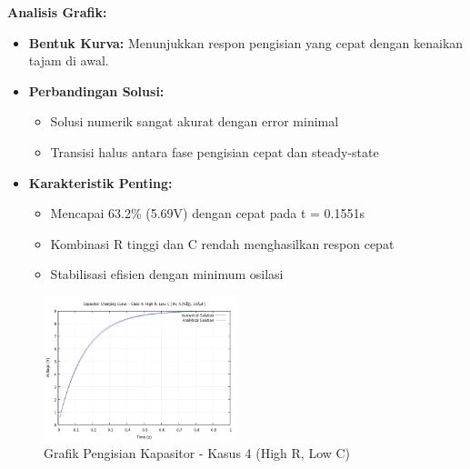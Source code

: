 \documentclass[conference]{IEEEtran}
\begin{document}
\textbf{Analisis Grafik:}
\begin{itemize}
\item \textbf{Bentuk Kurva:} Menunjukkan respon pengisian yang cepat dengan kenaikan tajam di awal.
\item \textbf{Perbandingan Solusi:}
  \begin{itemize}
  \item Solusi numerik sangat akurat dengan error minimal
  \item Transisi halus antara fase pengisian cepat dan steady-state
  \end{itemize}
\item \textbf{Karakteristik Penting:}
  \begin{itemize}
  \item Mencapai 63.2\% (5.69V) dengan cepat pada t = 0.1551s
  \item Kombinasi R tinggi dan C rendah menghasilkan respon cepat
  \item Stabilisasi efisien dengan minimum osilasi
  \end{itemize}
\end{itemize}

\begin{figure}[H]
    \centering
    \includegraphics[width=0.5\textwidth]{Grafik/Grafik4.png}
    \caption{Grafik Pengisian Kapasitor - Kasus 4 (High R, Low C)}
    \label{fig:case4}
\end{figure}
\end{document}
